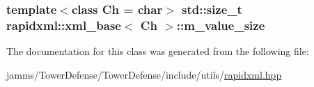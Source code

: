 \hypertarget{classrapidxml_1_1xml__base_aa3a49d8ceddb8a8d7edb773a2226b89c}{
\subsubsection[{m\+\_\+value\+\_\+size}]{\setlength{\rightskip}{0pt plus 5cm}template$<$class Ch  = char$>$ std\+::size\+\_\+t {\bf rapidxml\+::xml\+\_\+base}$<$ Ch $>$\+::m\+\_\+value\+\_\+size\hspace{0.3cm}{\ttfamily [protected]}}}\label{classrapidxml_1_1xml__base_aa3a49d8ceddb8a8d7edb773a2226b89c}


The documentation for this class was generated from the following file\+:\begin{DoxyCompactItemize}
\item 
jamms/\+Tower\+Defense/\+Tower\+Defense/include/utils/\hyperlink{rapidxml_8hpp}{rapidxml.\+hpp}\end{DoxyCompactItemize}
